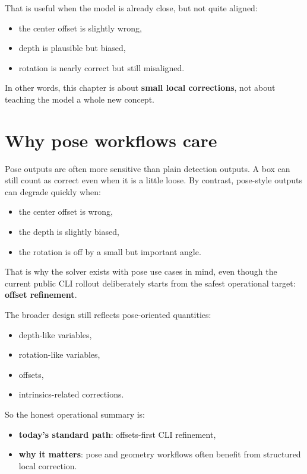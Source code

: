 That is useful when the model is already close, but not quite aligned:
\begin{itemize}
  \item the center offset is slightly wrong,
  \item depth is plausible but biased,
  \item rotation is nearly correct but still misaligned.
\end{itemize}

In other words, this chapter is about \textbf{small local corrections}, not about teaching the model a whole new concept.

\section{Why pose workflows care}
Pose outputs are often more sensitive than plain detection outputs.
A box can still count as correct even when it is a little loose.
By contrast, pose-style outputs can degrade quickly when:
\begin{itemize}
  \item the center offset is wrong,
  \item the depth is slightly biased,
  \item the rotation is off by a small but important angle.
\end{itemize}

That is why the solver exists with pose use cases in mind, even though the current public CLI rollout deliberately starts from the safest operational target: \textbf{offset refinement}.

The broader design still reflects pose-oriented quantities:
\begin{itemize}
  \item depth-like variables,
  \item rotation-like variables,
  \item offsets,
  \item intrinsics-related corrections.
\end{itemize}

So the honest operational summary is:
\begin{itemize}
  \item \textbf{today's standard path}: offsets-first CLI refinement,
  \item \textbf{why it matters}: pose and geometry workflows often benefit from structured local correction.
\end{itemize}

